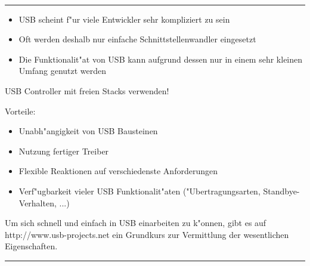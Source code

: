 \documentclass[11pt]{article}
\begin{document}
\begin{minipage}[t]{7cm}
\hfill {\Large{}}\\
\hrule
{}

\bigskip

\begin{itemize}
\item USB scheint f"ur viele Entwickler sehr kompliziert zu sein 
\item Oft werden deshalb nur einfache Schnittstellenwandler eingesetzt
\item Die Funktionalit"at von USB kann aufgrund dessen nur in einem sehr kleinen Umfang genutzt werden 
\end{itemize}

\medskip


\begin{center}
  {\large USB Controller mit freien Stacks verwenden!}
\end{center}

Vorteile:

\begin{itemize}
\item Unabh"angigkeit von USB Bausteinen
\item Nutzung fertiger Treiber
\item Flexible Reaktionen auf verschiedenste Anforderungen
\item Verf"ugbarkeit vieler USB Funktionalit"aten ("Ubertragungsarten, Standbye-Verhalten, ...) 
\end{itemize}

Um sich schnell und einfach in USB einarbeiten zu k"onnen,
gibt es auf http://www.usb-projects.net ein
Grundkurs zur Vermittlung der wesentlichen Eigenschaften.


\end{minipage}
\hskip 12mm
\rule[-18.8cm]{0.2pt}{5mm}  %
\hskip 12mm
\end{document}
